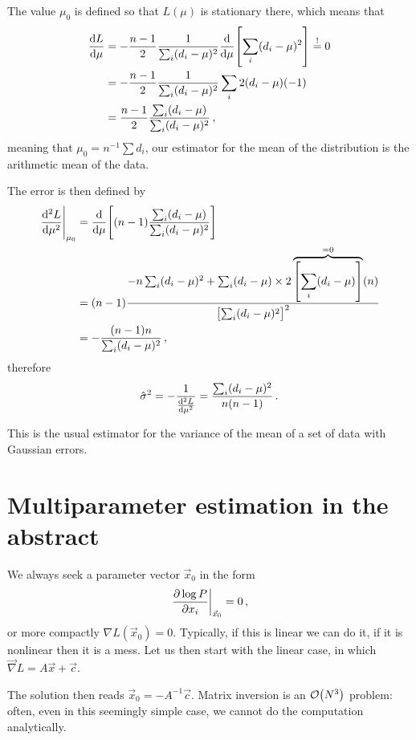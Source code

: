 \documentclass[main.tex]{subfiles}
\begin{document}
The value \(\mu_0\) is defined so that \(L(\mu )\) is stationary there, which means that 
%
\begin{align}
\dv{L}{\mu } &= -\frac{n-1}{2}  \frac{1}{\sum _{i} (d_i - \mu)^2} \dv{}{\mu } \qty[\sum _{i} (d_i - \mu)^2] \overset{!}{=} 0  \\
&= -\frac{n-1}{2}  \frac{1}{\sum _{i} (d_i - \mu)^2} \sum _{i} 2 (d_i - \mu ) (-1)  \\
&= \frac{n-1}{2} \frac{\sum _{i} (d_i - \mu ) }{\sum_i (d_i - \mu )^2}
\,,
\end{align}
%
meaning that \(\mu_0 = n^{-1} \sum d_i\), our estimator for the mean of the distribution is the arithmetic mean of the data. 


The error is then defined by 
%
\begin{align}
\eval{\dv[2]{L}{\mu }}_{\mu_0 } &= \dv{}{\mu } \qty[(n-1) \frac{\sum _{i} (d_i - \mu)}{\sum _{i } (d_i - \mu )^2}]  \\
&= (n-1) \frac{- n \sum _{i} (d_i - \mu)^2 + \sum _{i} (d_i - \mu) \times 2 \overbrace{\qty[\sum_i (d_i - \mu )]}^{= 0} (n)}{\qty[\sum _{i} (d_i - \mu)^2]^2}  \\
&= - \frac{(n-1)n}{\sum _{i} (d_i - \mu)^2}
\,,
\end{align}
%
therefore 
%
\begin{align}
\hat{\sigma}^2 = - \frac{1}{\dv[2]{L}{\mu }} = \frac{\sum _{i}(d_i - \mu)^2}{n ( n-1)}
\,.
\end{align}

This is the usual estimator for the variance of the mean of a set of data with Gaussian errors. 

\section{Multiparameter estimation in the abstract}

We always seek a parameter vector \(\vec{x}_0\) in the form 
%
\begin{align}
\eval{\pdv{\log P}{x_i} }_{\vec{x}_0} = 0
\,,
\end{align}
%
or more compactly \(\nabla L (\vec{x}_0) =0 \). 
Typically, if this is linear we can do it, if it is nonlinear then it is a mess. 
Let us then start with the linear case, in which \(\vec{\nabla} L  = A \vec{x} + \vec{c}\).  

The solution then reads \(\vec{x}_0 = -A^{-1} \vec{c}\). 
Matrix inversion is an \(\order{N^3}\) problem: often, even in this seemingly simple case, we cannot do the computation analytically. 
\end{document}

